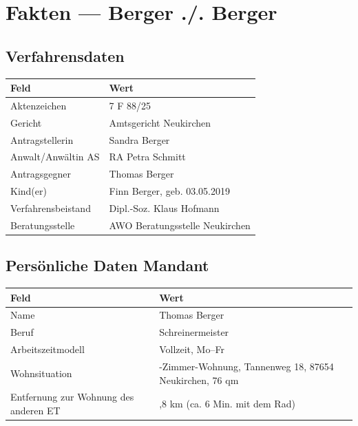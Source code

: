 \documentclass[
  11pt,
  a4paper,
]{article}
\newcounter{none}
\begin{document}

\section{Fakten --- Berger ./. Berger}\label{fakten-berger-..-berger}

\subsection{Verfahrensdaten}\label{verfahrensdaten}

{\def\LTcaptype{none} %
\begin{longtable}[]{@{}ll@{}}
\toprule\noalign{}
Feld & Wert \\
\midrule\noalign{}
\endhead
\bottomrule\noalign{}
\endlastfoot
Aktenzeichen & 7 F 88/25 \\
Gericht & Amtsgericht Neukirchen \\
Antragstellerin & Sandra Berger \\
Anwalt/Anwältin AS & RA Petra Schmitt \\
Antragsgegner & Thomas Berger \\
Kind(er) & Finn Berger, geb. 03.05.2019 \\
Verfahrensbeistand & Dipl.-Soz. Klaus Hofmann \\
Beratungsstelle & AWO Beratungsstelle Neukirchen \\
\end{longtable}
}

\subsection{Persönliche Daten
Mandant}\label{persuxf6nliche-daten-mandant}

{\def\LTcaptype{none} %
\begin{longtable}[]{@{}
  >{\raggedright\arraybackslash}p{}
  >{\raggedright\arraybackslash}p{}@{}}
\toprule\noalign{}
\begin{minipage}[b]{\linewidth}\raggedright
Feld
\end{minipage} & \begin{minipage}[b]{\linewidth}\raggedright
Wert
\end{minipage} \\
\midrule\noalign{}
\endhead
\bottomrule\noalign{}
\endlastfoot
Name & Thomas Berger \\
Beruf & Schreinermeister \\
Arbeitszeitmodell & Vollzeit, Mo--Fr \\
Wohnsituation & 3-Zimmer-Wohnung, Tannenweg 18, 87654 Neukirchen, 76
qm \\
Entfernung zur Wohnung des anderen ET & 1,8 km (ca. 6 Min. mit dem
Rad) \\
\end{longtable}
}
\end{document}
